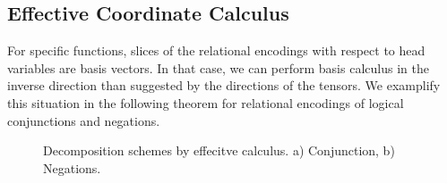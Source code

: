 \subsection{Effective Coordinate Calculus}\label{sec:effectiveCalculus} %


For specific functions, slices of the relational encodings with respect to head variables are basis vectors.
In that case, we can perform basis calculus in the inverse direction than suggested by the directions of the tensors.
We examplify this situation in the following theorem for relational encodings of logical conjunctions and negations.

\begin{figure}
\begin{center}
	
\end{center}
\caption{Decomposition schemes by effecitve calculus. a) Conjunction, b) Negations.}\label{fig:ConNegDecomposition}
\end{figure}

